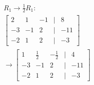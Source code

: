 \documentclass[preview]{standalone}
\begin{document}
\begin{align*}
R_1 \rightarrow \frac{1}{2}R_1:\\ \begin{bmatrix} 2 & 1 & -1 & | & 8 \\ -3 & -1 & 2 & | & -11 \\ -2 & 1 & 2 & | & -3 \end{bmatrix}\\ \rightarrow \begin{bmatrix} 1 & \frac{1}{2} & -\frac{1}{2} & | & 4 \\ -3 & -1 & 2 & | & -11 \\ -2 & 1 & 2 & | & -3 \end{bmatrix}
\end{align*}
\end{document}
